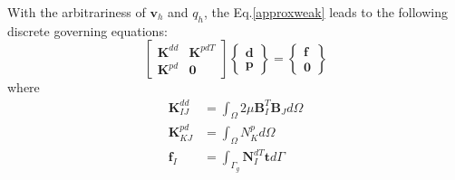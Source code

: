 With the arbitrariness of $\boldsymbol v_h$ and $q_h$, the Eq.\eqref{approxweak} leads to the following discrete governing equations:
\begin{equation}
    \begin{bmatrix}
        \boldsymbol K^{dd} & \boldsymbol K^{pdT} \\ \boldsymbol K^{pd} & \boldsymbol 0
    \end{bmatrix}
    \begin{Bmatrix}
        \boldsymbol d \\ \boldsymbol p 
    \end{Bmatrix} =
    \begin{Bmatrix}
        \boldsymbol f \\ \boldsymbol 0 
    \end{Bmatrix}
\end{equation}
where 
\begin{align}
    \boldsymbol K^{dd}_{IJ} &= \int_{\Omega} 2\mu \boldsymbol B_I^T \boldsymbol B_J d\Omega \\
    \boldsymbol K^{pd}_{KJ} &= \int_{\Omega} N_K^p d\Omega \\
    \boldsymbol f_I &= \int_{\Gamma_g} \boldsymbol N_I^{dT} \boldsymbol t d\Gamma
\end{align}
